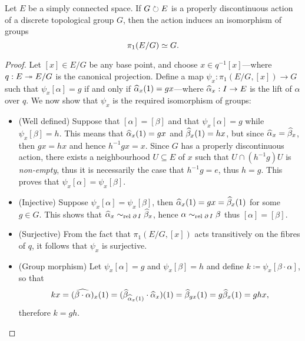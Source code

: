 \begin{proposition}
    \label{prop:prop-disc-and-1-connected-simply-connected-iso-grps}
    Let \(E\) be a simply connected space. If \(G \circlearrowright E\) is a properly
    discontinuous action of a discrete topological group \(G\), then the action
    induces an isomorphism of groups
    \[
        \pi_1(E/G) \simeq G.
    \]
\end{proposition}

\begin{proof}
    Let \([x] \in E/G\) be any base point, and choose \(x \in q^{-1}[x]\)---where
    \(q: E \twoheadrightarrow E/G\) is the canonical projection. Define a map
    \(\psi_x: \pi_1(E/G, [x]) \to G\) such that \(\psi_x[\alpha] = g\) if and only
    if \(\widehat \alpha_x(1) = g x\)---where \(\widehat \alpha_x: I \to E\) is the lift of
    \(\alpha\) over \(q\). We now show that \(\psi_x\) is the required isomorphism
    of groups:
    \begin{itemize}\setlength\itemsep{0em}
        \item (Well defined) Suppose that \([\alpha] = [\beta]\) and that
              \(\psi_x[\alpha] = g\) while \(\psi_x[\beta] = h\). This means that
              \(\widehat \alpha_x(1) = g x\) and \(\widehat \beta_x(1) = h x\), but since
              \(\widehat \alpha_x = \widehat \beta_x\), then \(g x = h x\) and hence
              \(h^{-1} g x = x\). Since \(G\) has a properly discontinuous action, there
              exists a neighbourhood \(U \subseteq E\) of \(x\) such that
              \(U \cap (h^{-1} g) U\) is \emph{non-empty}, thus it is necessarily the case
              that \(h^{-1} g = e\), thus \(h = g\). This proves that
              \(\psi_x[\alpha] = \psi_x[\beta]\).

        \item (Injective) Suppose \(\psi_x [\alpha] = \psi_x [\beta]\), then
              \(\widehat \alpha_x(1) = g x = \widehat \beta_x(1)\) for some \(g \in G\). This
              shows that \(\widehat \alpha_x \sim_{\text{rel }{\operatorname{\partial}I}} \widehat \beta_x\), hence
              \(\alpha \sim_{\text{rel }{\operatorname{\partial}I}} \beta\) thus \([\alpha] = [\beta]\).

        \item (Surjective) From the fact that \(\pi_1(E/G, [x])\) acts transitively on
              the fibres of \(q\), it follows that \(\psi_x\) is surjective.

        \item (Group morphism) Let \(\psi_x[\alpha] = g\) and \(\psi_x [\beta] = h\) and
              define \(k \coloneq \psi_x[\beta \cdot \alpha]\), so that
              \[
                  k x = (\widehat{\beta \cdot \alpha})_x(1)
                  = (\widehat \beta_{\widehat \alpha_x(1)} \cdot \widehat \alpha_x)(1)
                  = \widehat \beta_{g x}(1)
                  = g \widehat \beta_x(1)
                  = g h x,
              \]
              therefore \(k = g h\).
    \end{itemize}
\end{proof}

